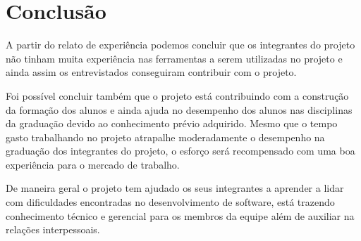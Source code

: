 \section{Conclusão}
\label{sec:conclusao}

A partir do relato de experiência podemos concluir que os integrantes do projeto não tinham muita experiência nas ferramentas a serem utilizadas no projeto e ainda assim os entrevistados conseguiram contribuir com o projeto.

Foi possível concluir também que o projeto está contribuindo com a construção da formação dos alunos e ainda ajuda no desempenho dos alunos nas disciplinas da graduação devido ao conhecimento prévio adquirido. Mesmo que o tempo gasto trabalhando no projeto atrapalhe moderadamente o desempenho na graduação dos integrantes do projeto, o esforço será recompensado com uma boa experiência para o mercado de trabalho.

De maneira geral o projeto tem ajudado os seus integrantes a aprender a lidar com dificuldades encontradas no desenvolvimento de software, está trazendo conhecimento técnico e gerencial para os membros da equipe além de auxiliar na relações interpessoais.